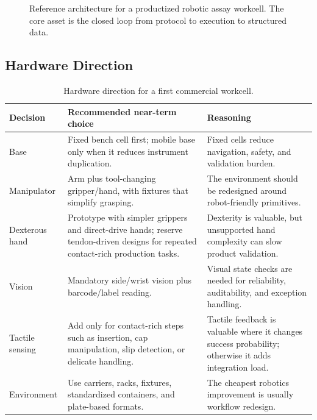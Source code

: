 \documentclass[11pt]{article}
\begin{document}
\begin{figure}[htbp]
{}
\caption{Reference architecture for a productized robotic assay workcell. The core asset is the closed loop from protocol to execution to structured data.}
\label{fig:architecture}
\end{figure}

\subsection{Hardware Direction}

\begin{table}[htbp]
\centering
\small
\begin{tabularx}{\linewidth}{@{}L{3.2cm}YY@{}}
\toprule
\textbf{Decision} & \textbf{Recommended near-term choice} & \textbf{Reasoning} \\
\midrule
Base & Fixed bench cell first; mobile base only when it reduces instrument duplication. & Fixed cells reduce navigation, safety, and validation burden. \\
Manipulator & Arm plus tool-changing gripper/hand, with fixtures that simplify grasping. & The environment should be redesigned around robot-friendly primitives. \\
Dexterous hand & Prototype with simpler grippers and direct-drive hands; reserve tendon-driven designs for repeated contact-rich production tasks. & Dexterity is valuable, but unsupported hand complexity can slow product validation. \\
Vision & Mandatory side/wrist vision plus barcode/label reading. & Visual state checks are needed for reliability, auditability, and exception handling. \\
Tactile sensing & Add only for contact-rich steps such as insertion, cap manipulation, slip detection, or delicate handling. & Tactile feedback is valuable where it changes success probability; otherwise it adds integration load. \\
Environment & Use carriers, racks, fixtures, standardized containers, and plate-based formats. & The cheapest robotics improvement is usually workflow redesign. \\
\bottomrule
\end{tabularx}
\caption{Hardware direction for a first commercial workcell.}
\label{tab:hardware}
\end{table}
\end{document}
